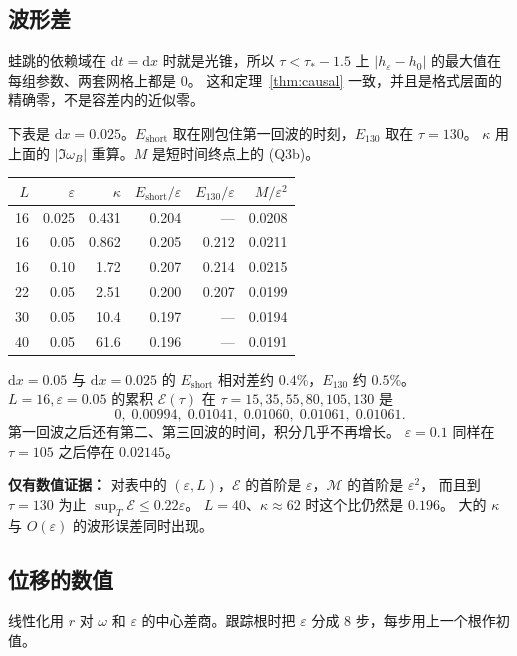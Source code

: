 \documentclass[11pt]{ctexart}
\theoremstyle{definition}
\theoremstyle{remark}
\newcommand{\eps}{\varepsilon}
\newcommand{\cE}{\mathcal E}
\newcommand{\cM}{\mathcal M}
\newcommand{\dx}{\mathrm{d}x}
\newcommand{\dt}{\mathrm{d}t}
\begin{document}
\subsection{波形差}

蛙跳的依赖域在 $\dt=\dx$ 时就是光锥，所以 $\tau<\tau_*-1.5$ 上 $|h_\eps-h_0|$ 的最大值在每组参数、两套网格上都是 $0$。
这和定理~\ref{thm:causal} 一致，并且是格式层面的精确零，不是容差内的近似零。

下表是 $\dx=0.025$。$E_{\mathrm{short}}$ 取在刚包住第一回波的时刻，$E_{130}$ 取在 $\tau=130$。
$\kappa$ 用上面的 $|\Im\omega_B|$ 重算。$M$ 是短时间终点上的 (Q3b)。

\begin{center}
\small
\begin{tabular}{rrrrrr}
\toprule
$L$ & $\eps$ & $\kappa$ & $E_{\mathrm{short}}/\eps$ & $E_{130}/\eps$ & $M/\eps^2$\\
\midrule
16 & 0.025 & 0.431 & 0.204 & --- & 0.0208\\
16 & 0.05 & 0.862 & 0.205 & 0.212 & 0.0211\\
16 & 0.10 & 1.72 & 0.207 & 0.214 & 0.0215\\
22 & 0.05 & 2.51 & 0.200 & 0.207 & 0.0199\\
30 & 0.05 & 10.4 & 0.197 & --- & 0.0194\\
40 & 0.05 & 61.6 & 0.196 & --- & 0.0191\\
\bottomrule
\end{tabular}
\end{center}

$\dx=0.05$ 与 $\dx=0.025$ 的 $E_{\mathrm{short}}$ 相对差约 $0.4\%$，$E_{130}$ 约 $0.5\%$。
$L=16,\eps=0.05$ 的累积 $\cE(\tau)$ 在 $\tau=15,35,55,80,105,130$ 是
\[
0,\;0.00994,\;0.01041,\;0.01060,\;0.01061,\;0.01061.
\]
第一回波之后还有第二、第三回波的时间，积分几乎不再增长。
$\eps=0.1$ 同样在 $\tau=105$ 之后停在 $0.02145$。

\textbf{仅有数值证据：}
对表中的 $(\eps,L)$，$\cE$ 的首阶是 $\eps$，$\cM$ 的首阶是 $\eps^2$，
而且到 $\tau=130$ 为止 $\sup_T\cE\le 0.22\eps$。
$L=40$、$\kappa\approx62$ 时这个比仍然是 $0.196$。
大的 $\kappa$ 与 $O(\eps)$ 的波形误差同时出现。

\subsection{位移的数值}

线性化用 $r$ 对 $\omega$ 和 $\eps$ 的中心差商。跟踪根时把 $\eps$ 分成 $8$ 步，每步用上一个根作初值。
\end{document}
